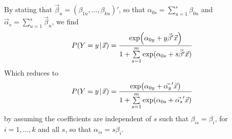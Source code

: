 \documentclass[12pt]{article}
\begin{document}
By stating that $\vec{\beta}_{u}=(\beta_{1u},\ldots,\beta_{ku})'$, so that $\alpha_{0s}=\sum_{u=1}^{s}\beta_{0u}$ and $\vec{\alpha}_{s}=\sum_{u=1}^{s}\vec{\beta}_{u}$, we find
\begin{align*}
	P(Y=y\!\mid\!\vec{x})=\frac{\textup{exp}\!\left(\alpha_{0y}+y\vec{\beta}'\vec{x}\right)}{1+\sum\limits_{s=1}^{m}\textup{exp}(\alpha_{0s}+s\vec{\beta}'\vec{x})}
\end{align*}
Which reduces to
\begin{align*}
	P(Y=y\!\mid\!\vec{x})=\frac{\textup{exp}\!\left(\alpha_{0y}+\vec{\alpha_y}'\vec{x}\right)}{1+\sum\limits_{s=1}^{m}\textup{exp}(\alpha_{0s}+\vec{\alpha_s}'\vec{x})}
\end{align*}
by assuming the coefficients are independent of $s$ such that $\beta_{is}=\beta_{i}$, for $i=1,\ldots,k$ and all $s$, so that $\alpha_{is}=s\beta_{i}$.
\end{document}
